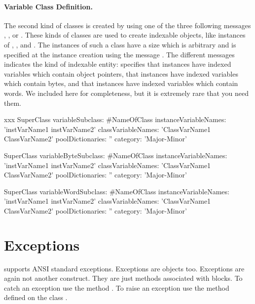 \documentclass[a4paper,10pt,twoside]{book}
\begin{document}
\paragraph{Variable Class Definition.}
The second kind of classes is created by using one of the three following messages , , or  . These kinds of classes are used to create indexable objects, \ie like instances of , , and . The instances of such a class have a size which is arbitrary and is specified at the instance creation using the message .
The different messages indicates the kind of indexable entity:  specifies that instances have indexed variables which contain object pointers,  that instances have indexed variables which contain bytes, and that instances have indexed variables which contain words.  We included here for completeness, but it is extremely rare that you need them.

\begin{classdef}[xxx]{xxx}
SuperClass variableSubclass: #NameOfClass
    instanceVariableNames: 'instVarName1 instVarName2'
    classVariableNames: 'ClassVarName1 ClassVarName2'
    poolDictionaries: ''
    category: 'Major-Minor'

SuperClass variableByteSubclass: #NameOfClass
    instanceVariableNames: 'instVarName1 instVarName2'
    classVariableNames: 'ClassVarName1 ClassVarName2'
    poolDictionaries: ''
    category: 'Major-Minor'

SuperClass variableWordSubclass: #NameOfClass
    instanceVariableNames: 'instVarName1 instVarName2'
    classVariableNames: 'ClassVarName1 ClassVarName2'
    poolDictionaries: ''
    category: 'Major-Minor'
\end{classdef}


\section{Exceptions}


\sq supports ANSI standard exceptions. Exceptions are objects too. Exceptions are again not another construct. They are just methods associated with blocks. To catch an exception use the method . To raise an exception use the method  defined on the class .
\end{document}
